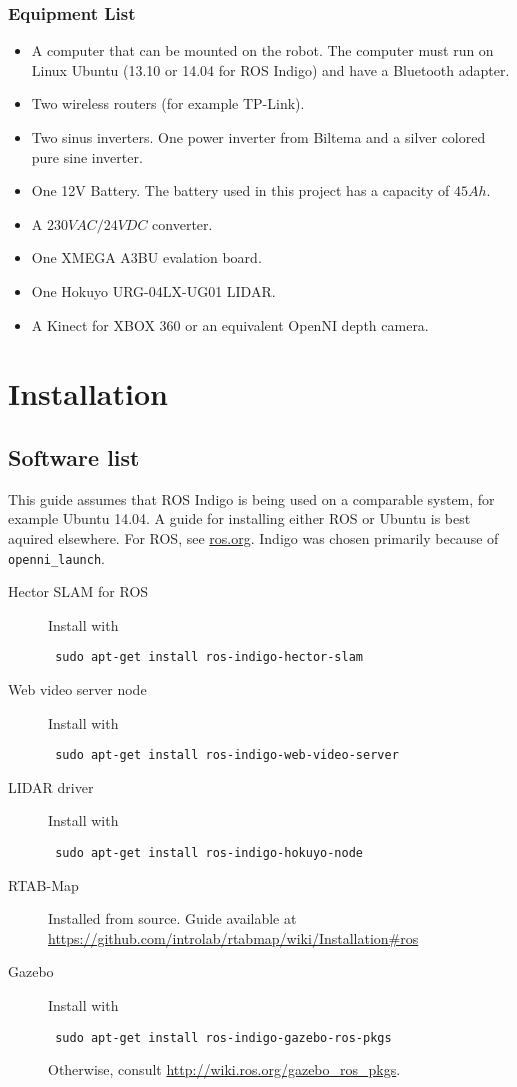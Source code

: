 \subsubsection{Equipment List}
\begin{itemize}
	\item A computer that can be mounted on the robot. The computer must run on Linux Ubuntu (13.10 or 14.04 for ROS Indigo) and have a Bluetooth adapter.
	\item Two wireless routers (for example TP-Link).
	\item Two sinus inverters. One power inverter from Biltema and a silver colored pure sine inverter.
	\item One 12V Battery. The battery used in this project has a capacity of $45 Ah$.
	\item A $230V AC/24V DC$ converter.
	\item One XMEGA A3BU evalation board.
	\item One Hokuyo URG-04LX-UG01 LIDAR.
	\item A Kinect for XBOX 360 or an equivalent OpenNI depth camera.
\end{itemize}



\section{Installation}

\subsection{Software list}

This guide assumes that ROS Indigo is being used on a comparable system, for example Ubuntu 14.04. A guide for installing either ROS or Ubuntu is best aquired elsewhere. For ROS, see \url{ros.org}. Indigo was chosen primarily because of \texttt{openni\_launch}. 

\begin{description}
	\item[Hector SLAM for ROS] Install with \begin{verbatim} sudo apt-get install ros-indigo-hector-slam \end{verbatim}
	\item[Web video server node] Install with \begin{verbatim} sudo apt-get install ros-indigo-web-video-server \end{verbatim}
	\item[LIDAR driver] Install with \begin{verbatim} sudo apt-get install ros-indigo-hokuyo-node \end{verbatim}
	\item[RTAB-Map] Installed from source. Guide available at\\
	\url{https://github.com/introlab/rtabmap/wiki/Installation#ros}
	\item[Gazebo]  Install with \begin{verbatim} sudo apt-get install ros-indigo-gazebo-ros-pkgs \end{verbatim}
	Otherwise, consult \url{http://wiki.ros.org/gazebo_ros_pkgs}.
\end{description}

